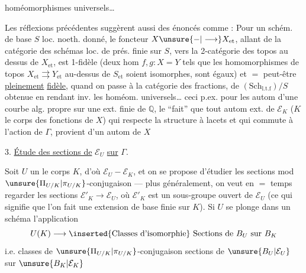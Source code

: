 homéomorphismes universels\ldots

Les réflexions précédentes suggèrent aussi des énoncés comme   : Pour un schém. de base $S$ loc. noeth. donné,
le foncteur $X\unsure{-|\longrightarrow}X_{\mathrm{et}}$, allant de la catégorie des schémas loc. de prés. finie  sur $S$, vers la 2-catégorie des topos au dessus de $X_{\mathrm{et}}$, est  1-fidèle (deux hom $f,g:X=Y$ tels que les homomorphismes de topos  $X_{\mathrm{et}}\rightrightarrows Y_{\mathrm{et}}$ au-dessus de $S_{\mathrm{et}}$ soient  isomorphes, sont égaux) et $=$ peut-être \uline{pleinement} \uline{fidèle}, quand on passe à la catégorie des fractions, de $(\mathrm{Sch}_{\mathrm{l.t.f}})/S$ obtenue en rendant inv. les homéom. universels\ldots {}  ceci p.ex. pour les autom d'une courbe alg. propre sur une ext. finie de $\mathbb{Q}$,   le ``fait'' que tout autom ext. de $\mathcal E_K$ ($K$ le corps des fonctions de $X$) qui respecte la structure à lacets et qui commute à l'action de $\Gamma$, provient d'un autom de $X$

3. \uline{Étude des sections de} $\mathcal{E}_U$ \uline{sur} $\Gamma$.

Soit $U$ un   le corps $K$, d'où $\mathcal{E}_U-\mathcal{E}_K$, et on se propose d'étudier les sections mod $\unsure{\Pi_{U/K}|\pi_{U/K}}$-conjugaison --- plus généralement, on veut en $=$ temps regarder les sections $\mathcal{E}'_K\longrightarrow\mathcal{E}_U$, où $\mathcal{E}'_K$ est un sous-groupe ouvert de $\mathcal{E}_U$ (ce qui signifie que l'on fait une extension de base finie sur $K$). Si  $U$ se plonge dans un schéma   l'application
\[
U(K)\longrightarrow \inserted{\text{Classes d'isomorphie}}\ \text{Sections de }B_U\text{ sur }B_K
\]
i.e. classes de $\unsure{\Pi_{U/K}|\pi_{U/K}}$-conjugaison  sections de $\unsure{B_U|\mathcal{E}_U}$ sur $\unsure{B_K|\mathcal{E}_K}$

